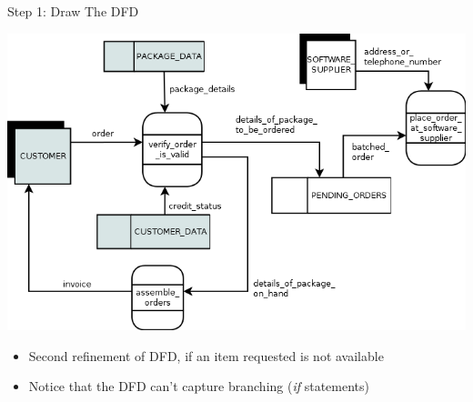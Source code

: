\documentclass{beamer}
\begin{document}
	\begin{frame}{Step 1: Draw The DFD}
		\begin{center}
			\includegraphics[scale=0.3]{img/01_sally_dfd_second_refinement}
		\end{center}	
		\begin{itemize}
			\item Second refinement of DFD, if an item requested is not available
			\item Notice that the DFD can't capture branching (\textit{if} statements)
		\end{itemize}
	\end{frame}
\end{document}
